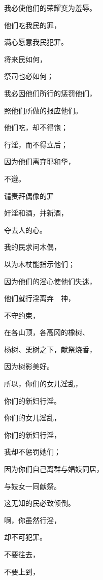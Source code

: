{\par }{\Q 我必使他们的荣耀变为羞辱。
\par }{\Q {}他们吃我民的{}罪{}，
\par }{\Q 满心愿意我民犯罪。
\par }{\Q {}将来民如何，
\par }{\Q 祭司也必如何；
\par }{\Q 我必因他们所行的惩罚他们，
\par }{\Q 照他们所做的报应他们。
\par }{\Q {}他们吃，却不得饱；
\par }{\Q 行淫，而不得立后；
\par }{\Q 因为他们离弃耶和华，
\par }{\Q 不遵{}。
\par }{\SH 谴责拜偶像的罪
\par }{\Q {}奸淫和酒，并新酒，
\par }{\Q 夺去人的心。
\par }{\Q {}我的民求问木偶，
\par }{\Q 以为木杖能指示他们；
\par }{\Q 因为他们的淫心使他们失迷，
\par }{\Q 他们就行淫离弃　神，
\par }{\Q 不守约束，
\par }{\Q {}在各山顶，各高冈的橡树、
\par }{\Q 杨树、栗树之下，献祭烧香，
\par }{\Q 因为树影美好。
\par }{\BB \par }{\Q 所以，你们的女儿淫乱，
\par }{\Q 你们的新妇行淫。
\par }{\Q {}你们的女儿淫乱，
\par }{\Q 你们的新妇行淫，
\par }{\Q 我却不惩罚她们；
\par }{\Q 因为你们自己离群与娼妓同居，
\par }{\Q 与妓女一同献祭。
\par }{\Q 这无知的民必致倾倒。
\par }{\BB \par }{\Q {}啊，你虽然行淫，
\par }{却不可犯罪。
\par }{\Q 不要往{}去，
\par }{\Q 不要上到{}，
}
